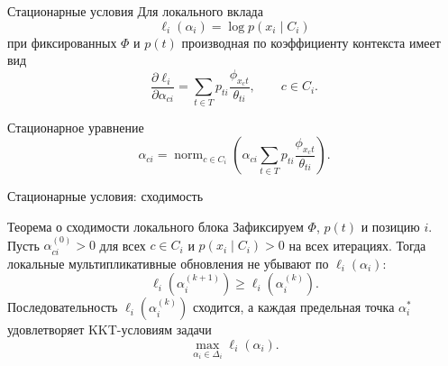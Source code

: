 \documentclass[aspectratio=169]{beamer}
\newcommand{\normop}{\operatorname{norm}}
\begin{document}
\begin{frame}{Стационарные условия}
    Для локального вклада
    \[
        \ell_i(\alpha_i)=\log p(x_i\mid C_i)
    \]
    при фиксированных \(\Phi\) и \(p(t)\) производная по коэффициенту
    контекста имеет вид
    \[
        \frac{\partial \ell_i}{\partial \alpha_{ci}}
        =
        \sum_{t\in T}p_{ti}\frac{\phi_{x_c t}}{\theta_{ti}},
        \qquad c\in C_i.
    \]

    \begin{block}{Стационарное уравнение}
        \[
        \alpha_{ci}=
        \normop_{c\in C_i}\left(
        \alpha_{ci}\sum_{t\in T}
        p_{ti}\frac{\phi_{x_c t}}{\theta_{ti}}
        \right).
        \]
    \end{block}

\end{frame}

\begin{frame}{Стационарные условия: сходимость}
    \small
    \begin{block}{Теорема о сходимости локального блока}
        Зафиксируем \(\Phi\), \(p(t)\) и позицию \(i\). Пусть
        \(\alpha_{ci}^{(0)}>0\) для всех \(c\in C_i\) и
        \(p(x_i\mid C_i)>0\) на всех итерациях. Тогда локальные
        мультипликативные обновления не убывают по
        \(\ell_i(\alpha_i)\):
        \[
            \ell_i(\alpha_i^{(k+1)})
            \ge
            \ell_i(\alpha_i^{(k)}).
        \]
        Последовательность \(\ell_i(\alpha_i^{(k)})\) сходится, а
        каждая предельная точка \(\alpha_i^\ast\) удовлетворяет
        KKT-условиям задачи
        \[
            \max_{\alpha_i\in\Delta_i}\ell_i(\alpha_i).
        \]
    \end{block}
\end{frame}
\end{document}
